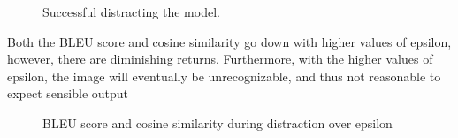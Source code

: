 \begin{figure}[ht]
{        \label{fig:attention_clean_field}
    }
    \vspace{\floatsep}
    \caption{Successful distracting the model.}
    \label{fig:distract_field_all}
\end{figure}

Both the BLEU score and cosine similarity go down with higher values of epsilon, however, there are diminishing returns. Furthermore, with the higher values of epsilon, the image will eventually be unrecognizable, and thus not reasonable to expect sensible output

\begin{figure}[h]
    \vspace{\floatsep}
    \caption{BLEU score and cosine similarity during distraction over epsilon}
\end{figure}
